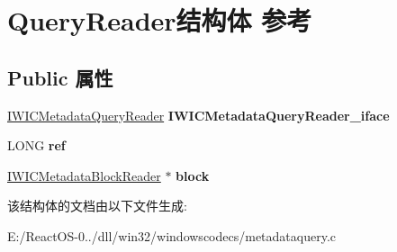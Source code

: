 \hypertarget{struct_query_reader}{}\section{Query\+Reader结构体 参考}
\label{struct_query_reader}
\subsection*{Public 属性}
\begin{DoxyCompactItemize}
\item 
\mbox{\label{struct_query_reader_a47c8cdc79674d9a09eaa35a45dcab47a}} 
\hyperlink{interface_i_w_i_c_metadata_query_reader}{I\+W\+I\+C\+Metadata\+Query\+Reader} {\bfseries I\+W\+I\+C\+Metadata\+Query\+Reader\+\_\+iface}
\item 
\mbox{\label{struct_query_reader_ac59d7b9562a015ceca3436dc73210dd0}} 
L\+O\+NG {\bfseries ref}
\item 
\mbox{\label{struct_query_reader_a59d50d5b397c940b1a1d3198f0c76850}} 
\hyperlink{interface_i_w_i_c_metadata_block_reader}{I\+W\+I\+C\+Metadata\+Block\+Reader} $\ast$ {\bfseries block}
\end{DoxyCompactItemize}


该结构体的文档由以下文件生成\+:\begin{DoxyCompactItemize}
\item 
E\+:/\+React\+O\+S-\/0../dll/win32/windowscodecs/metadataquery.\+c\end{DoxyCompactItemize}
